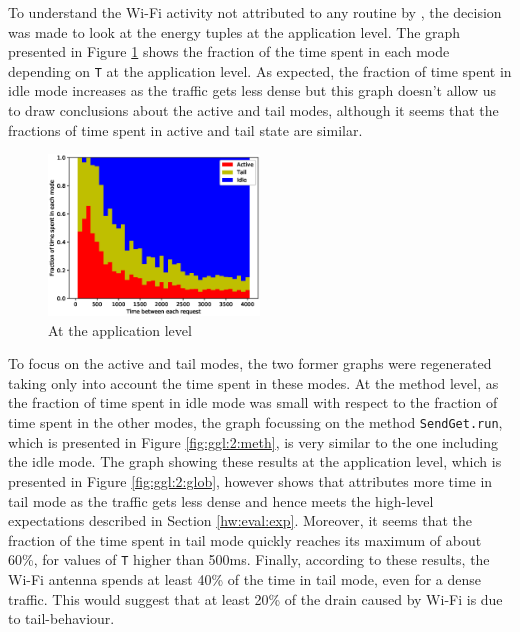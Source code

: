To understand the Wi-Fi activity not attributed to any routine by 
\Orka{}, the decision was made to look at the energy tuples at the 
application level. The graph presented in Figure \ref{fig:ggl:3:glob} 
shows the fraction of the time spent in each mode depending on 
\texttt{T} at the application level. As expected, the fraction of time 
spent in idle mode increases as the traffic gets less dense but this 
graph doesn't allow us to draw conclusions about the active and tail 
modes, although it seems that the fractions of time spent in active and 
tail state are similar.

\begin{figure}
  \includegraphics[width=0.5\textwidth]{figures/google_global_3states.eps}
  \caption{At the application level}
  \label{fig:ggl:3:glob}
\vspace {-0.32in}
\end{figure}


To focus on the active and tail modes, the two former graphs were 
regenerated taking only into account the time spent in these modes. At 
the method level, as the fraction of time spent in idle mode was small 
with respect to the fraction of time spent in the other modes, the graph 
focussing on the method \texttt{SendGet.run}, which is presented in 
Figure \ref{fig:ggl:2:meth}, is very similar to the one including the 
idle mode. The graph showing these results at the application level, 
which is presented in Figure \ref{fig:ggl:2:glob}, however shows that 
\orka{} attributes more time in tail mode as the traffic gets less dense 
and hence meets the high-level expectations described in Section 
\ref{hw:eval:exp}. Moreover, it seems that the fraction of the time 
spent in tail mode quickly reaches its maximum of about 60\%, for values 
of \texttt{T} higher than 500ms. Finally, according to these results, 
the Wi-Fi antenna spends at least 40\% of the time in tail mode, even 
for a dense traffic. This would suggest that at least 20\% of the drain 
caused by Wi-Fi is due to tail-behaviour.

